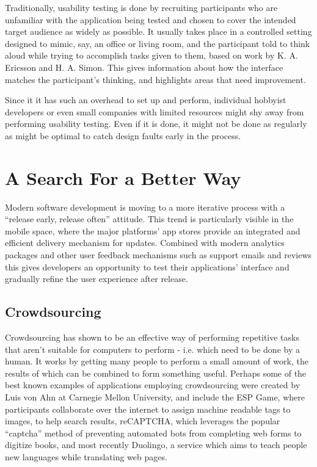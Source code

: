 Traditionally, usability testing is done by recruiting participants who are unfamiliar with the application being tested and chosen to cover the intended target audience as widely as possible. It usually takes place in a controlled setting designed to mimic, say, an office or living room, and the participant told to think aloud while trying to accomplish tasks given to them, based on work by K. A. Ericsson and H. A. Simon\cite{ericsson1980verbal}. This gives information about how the interface matches the participant’s thinking, and highlights areas that need improvement.

Since it it has such an overhead to set up and perform, individual hobbyist developers or even small companies with limited resources might shy away from performing usability testing. Even if it is done, it might not be done as regularly as might be optimal to catch design faults early in the process.

\section{A Search For a Better Way}

Modern software development is moving to a more iterative process with a “release early, release often” attitude. This trend is particularly visible in the mobile space, where the major platforms’ app stores provide an integrated and efficient delivery mechanism for updates. Combined with modern analytics packages and other user feedback mechanisms such as support emails and reviews this gives developers an opportunity to test their applications’ interface and gradually refine the user experience after release.

\subsection{Crowdsourcing}

Crowdsourcing has shown to be an effective way of performing repetitive tasks that aren't suitable for computers to perform - i.e. which need to be done by a human. It works by getting many people to perform a small amount of work, the results of which can be combined to form something useful. Perhaps some of the best known examples of applications employing crowdsourcing were created by Luis von Ahn at Carnegie Mellon University, and include the ESP Game, where participants collaborate over the internet to assign machine readable tags to images, to help search results, reCAPTCHA, which leverages the popular “captcha” method of preventing automated bots from completing web forms to digitize books, and most recently Duolingo, a service which aims to teach people new languages while translating web pages.

